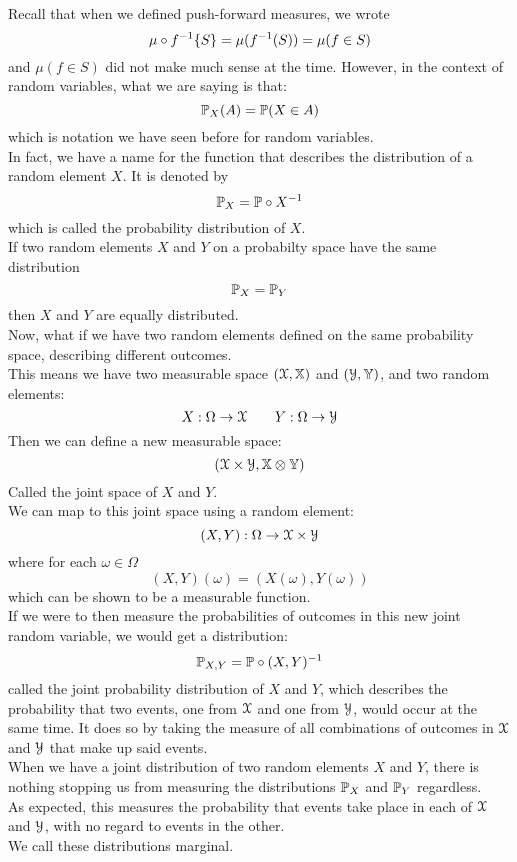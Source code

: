 \documentclass[12pt]{article}
\begin{document}
    Recall that when we defined
    push-forward measures,
    we wrote
    \[ \mu \circ f^{-1} \{S\} = \mu(f^{-1} (S)) 
    = \mu(f \in S) \]
    and 
    $\mu(f \in S)$
    did not make much sense at the time.
    However, in the context of random variables,
    what we are saying is that:
    \[ \mathbb{P}_X(A) = \mathbb{P}(X \in A) \]
    which is notation we have seen before
    for random variables. \\

    In fact, we have a name for the
    function that describes the distribution
    of a random element $X$.
    It is denoted by 
    \[ \mathbb{P}_X = \mathbb{P} \circ X^{-1} \]
    which is called the probability
    distribution of $X$. \\

    If two random elements $X$ and $Y$
    on a probabilty space
    have the same distribution
    \[ \mathbb{P}_X = \mathbb{P}_Y \]
    then $X$ and $Y$ are equally
    distributed. \\

    Now, what if we have two random elements
    defined on the same probability space,
    describing different outcomes. \\
    This means we have two measurable
    space $(\mathcal{X}, \mathbb{X})$
    and $(\mathcal{Y}, \mathbb{Y})$,
    and two random elements:
    \[ X: \Omega \to \mathcal{X} \qquad 
    Y: \Omega \to \mathcal{Y} \]
    Then we can define a new measurable space:
    \[ (\mathcal{X} \times \mathcal{Y}, \mathbb{X} \otimes \mathbb{Y}) \]
    Called the joint space of $X$
    and $Y$. \\
    We can map to this joint space using
    a random element:
    \[ (X, Y): \Omega \to \mathcal{X} \times \mathcal{Y}  \]
    where for each $\omega \in \Omega$
    \[ (X, Y)(\omega) = (X(\omega), Y(\omega)) \]
    which can be shown to be a measurable
    function. \\
    If we were to then measure the probabilities
    of outcomes in this new joint random variable,
    we would get a distribution:
    \[ \mathbb{P}_{X, Y} = \mathbb{P} \circ (X, Y)^{-1} \]
    called the joint probability distribution
    of $X$ and $Y$,
    which describes the probability that 
    two events, one from $\mathcal{X}$
    and one from $\mathcal{Y}$,
    would occur at the same time.
    It does so by taking the measure of all
    combinations of outcomes in
    $\mathcal{X}$ and $\mathcal{Y}$ that make up
    said events. \\

    When we have a joint distribution
    of two random elements $X$ and $Y$,
    there is nothing stopping us from measuring
    the distributions $\mathbb{P}_X$ and $\mathbb{P}_Y$
    regardless. \\
    As expected, this measures the probability
    that events take place in each of
    $\mathcal{X}$ and $\mathcal{Y}$,
    with no regard to events in the other. \\
    We call these distributions marginal. \\
\end{document}

